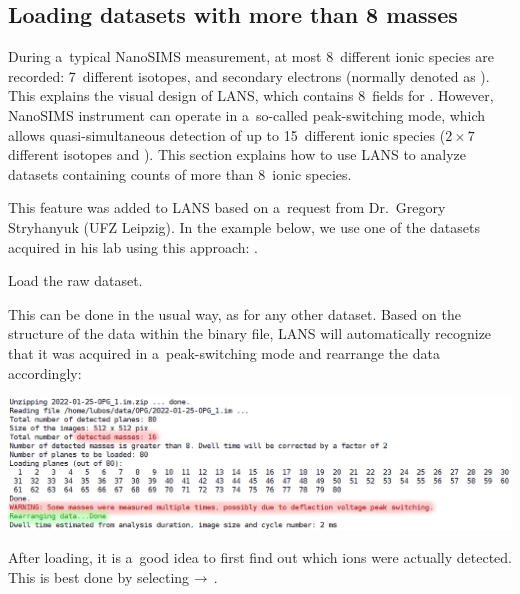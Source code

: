 \subsection{Loading datasets with more than 8 masses}
\setcounter{step}{0}

During a~typical NanoSIMS measurement, at most 8~different ionic species are recorded: 7~different isotopes, and secondary electrons (normally denoted as ). This explains the visual design of LANS, which contains 8~fields for . However, NanoSIMS instrument can operate in a~so-called peak-switching mode, which allows quasi-simultaneous detection of up to 15~different ionic species ($2\times 7$ different isotopes and ). This section explains how to use LANS to analyze datasets containing counts of more than 8~ionic species.
\tcbe

This feature was added to LANS based on a~request from Dr.~Gregory Stryhanyuk (UFZ Leipzig). In the example below, we use one of the datasets acquired in his lab using this approach: .

\s Load the raw dataset.

\nb\bul This can be done in the usual way, as for any other dataset. Based on the structure of the data within the binary file, LANS will automatically recognize that it was acquired in a~peak-switching mode and rearrange the data accordingly:
\begin{center}
\includegraphics[scale=0.34]{figs8/LANS-8plus-load}
\end{center}

\s After loading, it is a~good idea to first find out which ions were actually detected. This is best done by selecting  $\rightarrow$ .

